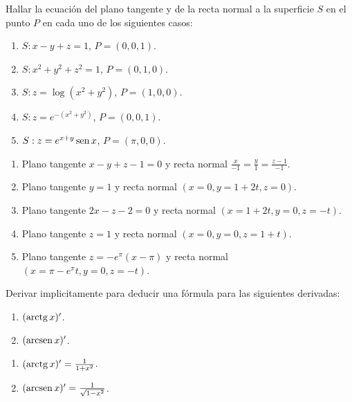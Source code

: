 {Hallar la ecuación del plano tangente y de la recta normal a la superficie $S$ en el punto $P$ en cada uno de los siguientes casos:
\begin{enumerate}
\item $S:x-y+z=1$, $P=(0,0,1)$.
\item $S:x^2+y^2+z^2=1$, $P=(0,1,0)$.
\item $S:z=\log(x^2+y^2)$, $P=(1,0,0)$.
\item $S:z=e^{-(x^2+y^2)}$, $P=(0,0,1)$.
\item $S:z=e^{x+y}\operatorname{sen} x$, $P=(\pi,0,0)$.
\end{enumerate}
}
{\begin{enumerate}
\item Plano tangente $x-y+z-1=0$ y recta normal $\frac{x}{-1}=\frac{y}{1}=\frac{z-1}{-1}$.
\item Plano tangente $y=1$ y recta normal $(x=0, y=1+2t, z=0)$.
\item Plano tangente $2x-z-2=0$ y recta normal $(x=1+2t, y=0, z=-t)$.
\item Plano tangente $z=1$ y recta normal $(x=0, y=0, z=1+t)$.
\item Plano tangente $z=-e^\pi(x-\pi)$ y recta normal $(x=\pi-e^\pi t, y=0, z=-t)$.
\end{enumerate}
}
{
}


{Derivar implicitamente para deducir una fórmula para las siguientes derivadas:
\begin{enumerate}
\item $(\operatorname{arctg} x)'$.
\item $(\operatorname{arcsen} x)'$.
\end{enumerate}
}
{\begin{enumerate}
\item $(\operatorname{arctg} x)'=\frac{1}{1+x^2}$.
\item $(\operatorname{arcsen} x)' = \frac{1}{\sqrt{1-x^2}}$.
\end{enumerate}
}
{
}
